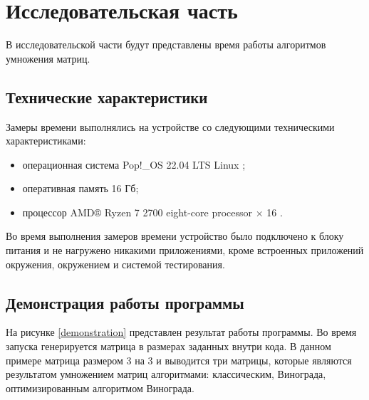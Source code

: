\chapter{Исследовательская часть}
В исследовательской части будут представлены время работы алгоритмов умножения матриц.  
\section{Технические характеристики}
Замеры времени выполнялись на устройстве со следующими техническими характеристиками:
\begin{itemize}
	\item операционная система Pop!\_OS 22.04 LTS \cite{ubuntu} Linux \cite{linux};
	\item оперативная память 16 Гб;
	\item процессор AMD® Ryzen 7 2700 eight-core processor × 16 \cite{amd}.
\end{itemize}
Во время выполнения замеров времени устройство было подключено к блоку питания и не нагружено никакими приложениями, кроме встроенных приложений окружения, окружением и системой тестирования.

\section{Демонстрация работы программы}

На рисунке \ref{demonstration} представлен результат работы программы. Во время запуска генерируется матрица в размерах заданных внутри кода. В данном примере матрица размером 3 на 3 и выводится три матрицы, которые являются результатом умножением матриц алгоритмами: классическим, Винограда, оптимизированным алгоритмом Винограда.

